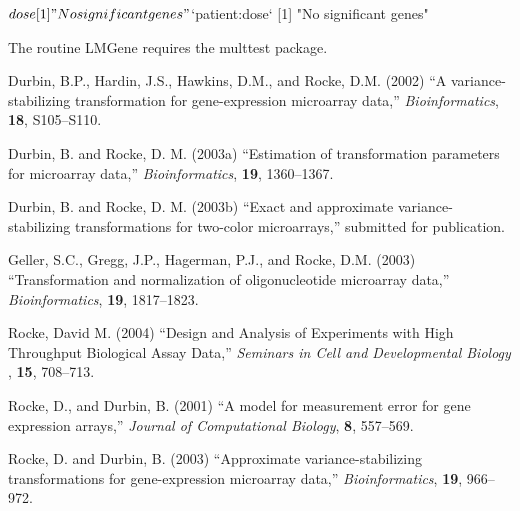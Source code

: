 \documentclass[11pt]{article}
\begin{document}
\begin{enumerate}
\begin{Schunk}
\begin{Soutput}
$dose
[1] "No significant genes"

$`patient:dose`
[1] "No significant genes"
\end{Soutput}
\end{Schunk}


\end{enumerate}

The routine LMGene requires the multtest package. 


\begin{thebibliography}{99}

Durbin, B.P., Hardin, J.S., Hawkins, D.M., and Rocke, D.M. (2002) ``A
variance-stabilizing transformation for gene-expression microarray
data,'' \emph{Bioinformatics}, {\bf18}, S105--S110.

Durbin, B. and Rocke, D. M. (2003a) ``Estimation of transformation
parameters for microarray data,'' \emph{Bioinformatics}, {\bf19}, 1360--1367.

Durbin, B. and Rocke, D. M. (2003b) ``Exact and approximate
variance-stabilizing transformations for two-color microarrays,''
submitted for publication.

Geller, S.C., Gregg, J.P., Hagerman, P.J., and Rocke, D.M. (2003)
``Transformation and normalization of oligonucleotide microarray
data,'' \emph{Bioinformatics}, {\bf19}, 1817--1823.

Rocke, David M. (2004) ``Design and Analysis of Experiments with High Throughput Biological Assay Data,'' 
\emph{Seminars in Cell and Developmental Biology },
{\bf15}, 708--713.

Rocke, D., and Durbin, B. (2001) ``A model for measurement error for
gene expression arrays,'' \emph{Journal of Computational Biology},
{\bf8}, 557--569.

Rocke, D. and Durbin, B. (2003) ``Approximate
variance-stabilizing transformations for gene-expression microarray
data,'' \emph{Bioinformatics}, {\bf19}, 966--972.

\end{thebibliography}

\end{document}
